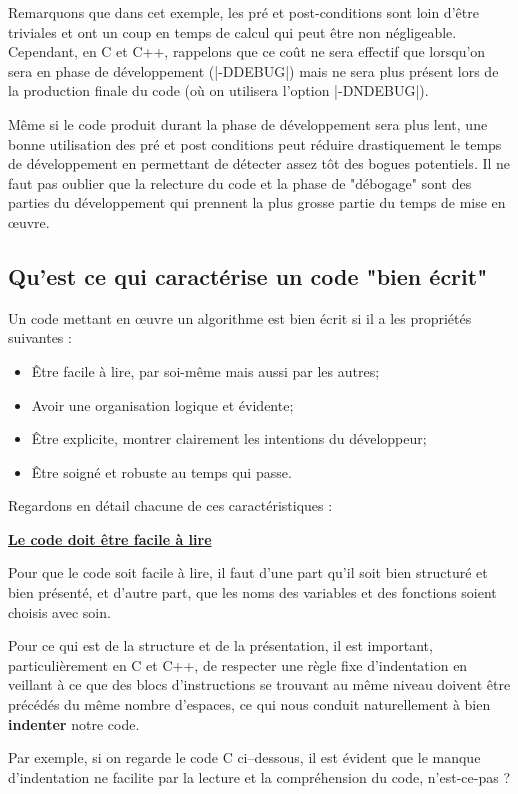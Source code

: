 Remarquons que dans cet exemple, les pré et post-conditions sont loin d'être triviales et ont un coup en temps de calcul qui peut être non négligeable. Cependant, en C et C++, rappelons que ce coût ne sera effectif que lorsqu'on sera en phase de développement (|-DDEBUG|) mais ne sera plus présent lors de la production finale du code (où on utilisera l'option |-DNDEBUG|).

Même si le code produit durant la phase de développement sera plus lent, une bonne utilisation des pré et post conditions peut réduire drastiquement le temps de développement en permettant de détecter assez tôt des bogues potentiels. Il ne faut pas oublier que la relecture du code et la phase de "débogage" sont des parties du développement qui prennent la plus grosse partie du temps de mise en {\oe}uvre.

\subsection{Qu'est ce qui caractérise un code "bien écrit"}

Un code mettant en {\oe}uvre un algorithme est bien écrit si il a les propriétés suivantes :
\begin{itemize}
  \item \^Etre facile à lire, par soi-même mais aussi par les autres;
  \item Avoir une organisation logique et évidente;
  \item \^Etre explicite, montrer clairement les intentions du développeur;
  \item \^Etre soigné et robuste au temps qui passe.
\end{itemize}

Regardons en détail chacune de ces caractéristiques :

\underline{\textbf{Le code doit être facile à lire}}

Pour que le code soit facile à lire, il faut d'une part qu'il soit bien structuré et bien présenté, et d'autre part,
que les noms des variables et des fonctions soient choisis avec soin.

Pour ce qui est de la structure et de la présentation, il est important, particulièrement en C et C++, de respecter une
règle fixe d'indentation en veillant à ce que des blocs d'instructions se trouvant au même niveau doivent être précédés
du même nombre d'espaces, ce qui nous conduit naturellement à bien \textbf{indenter} notre code.

Par exemple, si on regarde le code C ci--dessous, il est évident que le manque d'indentation ne facilite par la lecture et la compréhension du code, n'est-ce-pas ?

